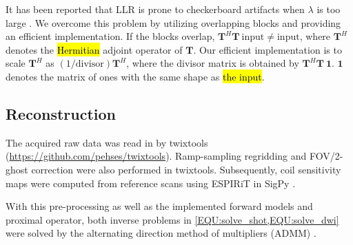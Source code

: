\documentclass[preprint,12pt,authoryear,review]{elsarticle}
\begin{document}
    It has been reported that LLR is prone to checkerboard artifacts
    when $\lambda$ is too large \citep{hu_2020_spa_llr}.
    We overcome this problem by utilizing overlapping blocks and providing an efficient implementation.
    If the blocks overlap, $\mathbf{T}^H \mathbf{T}~\mathrm{input} \neq \mathrm{input}$,
    where $\mathbf{T}^H$ denotes the \hl{Hermitian} adjoint operator of $\mathbf{T}$.
    Our efficient implementation is to scale $\mathbf{T}^H$
    as $(1 / \mathrm{divisor})\mathbf{T}^H$,
    where the divisor matrix is obtained by $\mathbf{T}^H \mathbf{T}~\mathbf{1}$.
    $\mathbf{1}$ denotes the matrix of ones with the same shape as \hl{the input}. 

    \subsection{Reconstruction}

    The acquired raw data was read in by twixtools
    (\url{https://github.com/pehses/twixtools}).
    Ramp-sampling regridding and FOV/2-ghost correction were also performed in twixtools.
    Subsequently, coil sensitivity maps were computed from reference scans
    using ESPIRiT \citep{uecker_2014_espirit} in SigPy \citep{ong_2019_sigpy}.

    With this pre-processing as well as
    the implemented forward models and proximal operator,
    both inverse problems in \cref{EQU:solve_shot,EQU:solve_dwi} were solved by
    the alternating direction method of multipliers (ADMM) \citep{boyd_2010_admm}.
\end{document}
